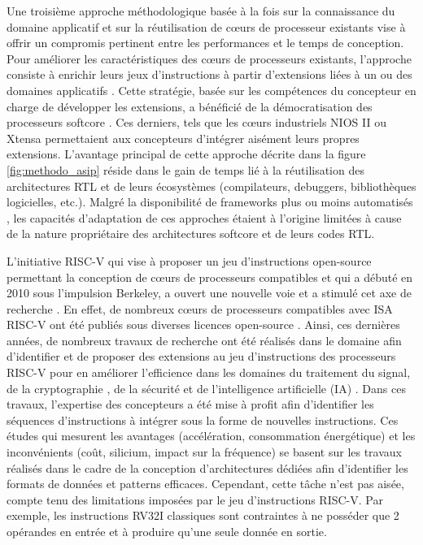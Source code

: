 \documentclass[../main.tex]{subfiles}
\begin{document}
Une troisième approche méthodologique basée à la fois sur la connaissance du domaine applicatif et sur la réutilisation de cœurs de processeur existants vise à offrir un compromis pertinent entre les performances et le temps de conception. Pour améliorer les caractéristiques des cœurs de processeurs existants, l’approche consiste à enrichir leurs jeux d’instructions à partir d’extensions liées à un ou des domaines applicatifs  \cite{INSTR:SURVEY}. Cette stratégie, basée sur les compétences du concepteur en charge de développer les extensions, a bénéficié de la démocratisation des processeurs softcore  \cite{SS1}. Ces derniers, tels que les cœurs industriels NIOS II \cite{NIOS:II} ou Xtensa  \cite{NIOS:II,XTENSA:1,XTENSA:2,XTENSA:3} permettaient aux concepteurs d’intégrer aisément leurs propres extensions.
L’avantage principal de cette approche décrite dans la figure \ref{fig:methodo_asip} réside dans le gain de temps lié à la réutilisation des architectures RTL et de leurs écosystèmes (compilateurs, debuggers, bibliothèques logicielles, etc.). Malgré la disponibilité de frameworks plus ou moins automatisés \cite{NIOS:II,XTENSA:1,phd_martin}, les capacités d’adaptation de ces approches étaient à l’origine limitées à cause de la nature propriétaire des architectures softcore et de leurs codes RTL.


L’initiative RISC-V qui vise à proposer un jeu d’instructions open-source permettant la conception de cœurs de processeurs compatibles et qui a débuté en 2010 sous l’impulsion Berkeley, a ouvert une nouvelle voie et a stimulé cet axe de recherche \cite{INSTR:SURVEY}. En effet, de nombreux cœurs de processeurs compatibles avec ISA RISC-V ont été publiés sous diverses licences open-source \cite{RISC:V:Survey,SS2}. Ainsi, ces dernières années, de nombreux travaux de recherche ont été réalisés dans le domaine afin d’identifier et de proposer des extensions au jeu d’instructions des processeurs RISC-V \cite{RISC:V:Survey} pour en améliorer l’efficience dans les domaines du traitement du signal, de la cryptographie \cite{RISC:V:AES}, de la sécurité \cite{RISC:V:FIXER} et de l’intelligence artificielle (IA) \cite{Ref_IA1}. Dans ces travaux, l’expertise des concepteurs a été mise à profit afin d’identifier les séquences d’instructions à intégrer sous la forme de nouvelles instructions. Ces études qui mesurent les avantages (accélération, consommation énergétique) et les inconvénients (coût, silicium, impact sur la fréquence) se basent sur les travaux réalisés dans le cadre de la conception d’architectures dédiées afin d’identifier les formats de données et patterns efficaces. Cependant, cette tâche n’est pas aisée, compte tenu des limitations imposées par le jeu d’instructions RISC-V. Par exemple, les instructions RV32I classiques sont contraintes à ne posséder que 2 opérandes en entrée et à produire qu’une seule donnée en sortie.
\end{document}
